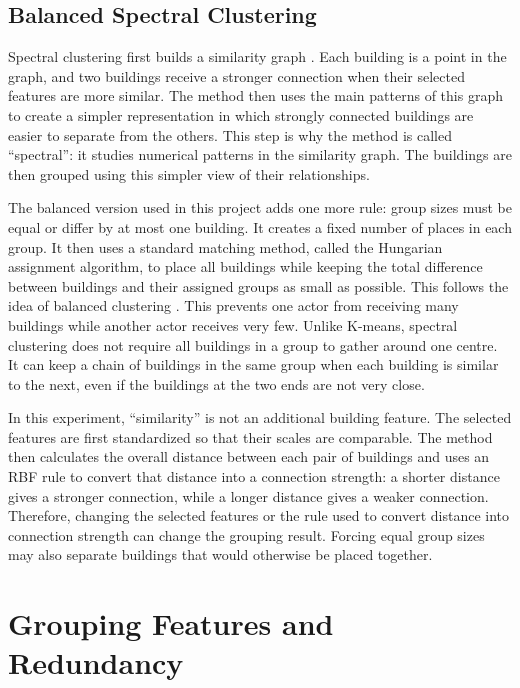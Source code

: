 \subsection{Balanced Spectral Clustering}

Spectral clustering first builds a similarity graph \cite{ng2001spectral}.
Each building is a point in the graph, and two buildings receive a stronger
connection when their selected features are more similar. The method then uses
the main patterns of this graph to create a simpler representation in which
strongly connected buildings are easier to separate from the others. This step
is why the method is called ``spectral'': it studies numerical patterns in the
similarity graph. The buildings are then grouped using this simpler view of
their relationships.

The balanced version used in this project adds one more rule: group sizes must
be equal or differ by at most one building. It creates a fixed number of places
in each group. It then uses a standard matching method, called the Hungarian
assignment algorithm, to place all buildings while keeping the total difference
between buildings and their assigned groups as small as possible. This follows
the idea of balanced clustering
\cite{malinen2014balanced}. This prevents one actor from receiving many
buildings while another actor receives very few. Unlike K-means, spectral
clustering does not require all buildings in a group to gather around one centre.
It can keep a chain of buildings in the same group when each building is similar
to the next, even if the buildings at the two ends are not very close.

In this experiment, ``similarity'' is not an additional building feature. The
selected features are first standardized so that their scales are comparable.
The method then calculates the overall distance between each pair of buildings
and uses an RBF rule to convert that distance into a connection strength: a
shorter distance gives a stronger connection, while a longer distance gives a
weaker connection. Therefore, changing the selected features or the rule used to
convert distance into connection strength can change the grouping result.
Forcing equal group sizes may also separate buildings that would otherwise be
placed together.


\section{Grouping Features and Redundancy}

